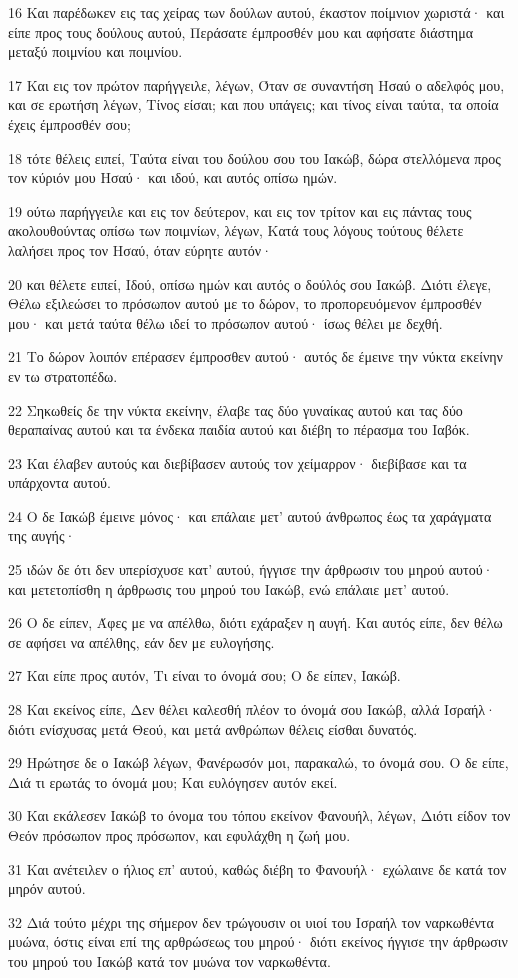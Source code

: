 \par 16 Και παρέδωκεν εις τας χείρας των δούλων αυτού, έκαστον ποίμνιον χωριστά· και είπε προς τους δούλους αυτού, Περάσατε έμπροσθέν μου και αφήσατε διάστημα μεταξύ ποιμνίου και ποιμνίου.
\par 17 Και εις τον πρώτον παρήγγειλε, λέγων, Όταν σε συναντήση Ησαύ ο αδελφός μου, και σε ερωτήση λέγων, Τίνος είσαι; και που υπάγεις; και τίνος είναι ταύτα, τα οποία έχεις έμπροσθέν σου;
\par 18 τότε θέλεις ειπεί, Ταύτα είναι του δούλου σου του Ιακώβ, δώρα στελλόμενα προς τον κύριόν μου Ησαύ· και ιδού, και αυτός οπίσω ημών.
\par 19 ούτω παρήγγειλε και εις τον δεύτερον, και εις τον τρίτον και εις πάντας τους ακολουθούντας οπίσω των ποιμνίων, λέγων, Κατά τους λόγους τούτους θέλετε λαλήσει προς τον Ησαύ, όταν εύρητε αυτόν·
\par 20 και θέλετε ειπεί, Ιδού, οπίσω ημών και αυτός ο δούλός σου Ιακώβ. Διότι έλεγε, Θέλω εξιλεώσει το πρόσωπον αυτού με το δώρον, το προπορευόμενον έμπροσθέν μου· και μετά ταύτα θέλω ιδεί το πρόσωπον αυτού· ίσως θέλει με δεχθή.
\par 21 Το δώρον λοιπόν επέρασεν έμπροσθεν αυτού· αυτός δε έμεινε την νύκτα εκείνην εν τω στρατοπέδω.
\par 22 Σηκωθείς δε την νύκτα εκείνην, έλαβε τας δύο γυναίκας αυτού και τας δύο θεραπαίνας αυτού και τα ένδεκα παιδία αυτού και διέβη το πέρασμα του Ιαβόκ.
\par 23 Και έλαβεν αυτούς και διεβίβασεν αυτούς τον χείμαρρον· διεβίβασε και τα υπάρχοντα αυτού.
\par 24 Ο δε Ιακώβ έμεινε μόνος· και επάλαιε μετ' αυτού άνθρωπος έως τα χαράγματα της αυγής·
\par 25 ιδών δε ότι δεν υπερίσχυσε κατ' αυτού, ήγγισε την άρθρωσιν του μηρού αυτού· και μετετοπίσθη η άρθρωσις του μηρού του Ιακώβ, ενώ επάλαιε μετ' αυτού.
\par 26 Ο δε είπεν, Άφες με να απέλθω, διότι εχάραξεν η αυγή. Και αυτός είπε, δεν θέλω σε αφήσει να απέλθης, εάν δεν με ευλογήσης.
\par 27 Και είπε προς αυτόν, Τι είναι το όνομά σου; Ο δε είπεν, Ιακώβ.
\par 28 Και εκείνος είπε, Δεν θέλει καλεσθή πλέον το όνομά σου Ιακώβ, αλλά Ισραήλ· διότι ενίσχυσας μετά Θεού, και μετά ανθρώπων θέλεις είσθαι δυνατός.
\par 29 Ηρώτησε δε ο Ιακώβ λέγων, Φανέρωσόν μοι, παρακαλώ, το όνομά σου. Ο δε είπε, Διά τι ερωτάς το όνομά μου; Και ευλόγησεν αυτόν εκεί.
\par 30 Και εκάλεσεν Ιακώβ το όνομα του τόπου εκείνον Φανουήλ, λέγων, Διότι είδον τον Θεόν πρόσωπον προς πρόσωπον, και εφυλάχθη η ζωή μου.
\par 31 Και ανέτειλεν ο ήλιος επ' αυτού, καθώς διέβη το Φανουήλ· εχώλαινε δε κατά τον μηρόν αυτού.
\par 32 Διά τούτο μέχρι της σήμερον δεν τρώγουσιν οι υιοί του Ισραήλ τον ναρκωθέντα μυώνα, όστις είναι επί της αρθρώσεως του μηρού· διότι εκείνος ήγγισε την άρθρωσιν του μηρού του Ιακώβ κατά τον μυώνα τον ναρκωθέντα.

